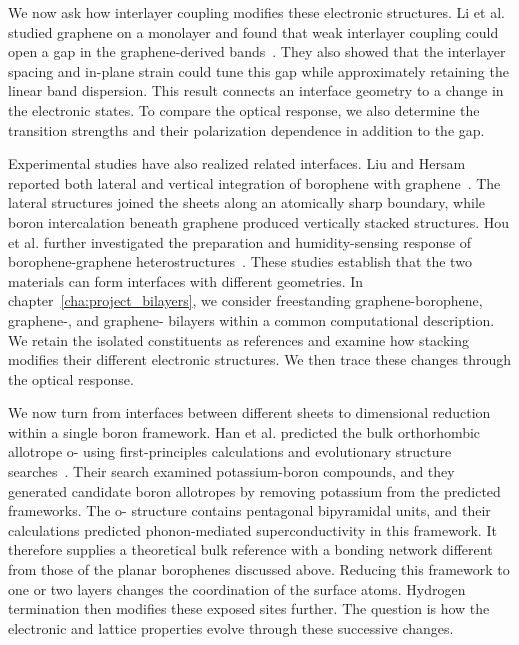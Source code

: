 We now ask how interlayer coupling modifies these electronic structures.
Li et al. studied graphene on a  monolayer and found that weak interlayer coupling could open a gap in the graphene-derived bands~\cite{li2014tunable}.
They also showed that the interlayer spacing and in-plane strain could tune this gap while approximately retaining the linear band dispersion.
This result connects an interface geometry to a change in the electronic states.
To compare the optical response, we also determine the transition strengths and their polarization dependence in addition to the gap.

Experimental studies have also realized related interfaces.
Liu and Hersam reported both lateral and vertical integration of borophene with graphene~\cite{liu2019borophene}.
The lateral structures joined the sheets along an atomically sharp boundary, while boron intercalation beneath graphene produced vertically stacked structures.
Hou et al. further investigated the preparation and humidity-sensing response of borophene-graphene heterostructures~\cite{hou2021borophene}.
These studies establish that the two materials can form interfaces with different geometries.
In chapter~\ref{cha:project_bilayers}, we consider freestanding graphene-borophene, graphene-, and graphene- bilayers within a common computational description.
We retain the isolated constituents as references and examine how stacking modifies their different electronic structures.
We then trace these changes through the optical response.

We now turn from interfaces between different sheets to dimensional reduction within a single boron framework.
Han et al. predicted the bulk orthorhombic allotrope o- using first-principles calculations and evolutionary structure searches~\cite{han2023superconducting}.
Their search examined potassium-boron compounds, and they generated candidate boron allotropes by removing potassium from the predicted frameworks.
The o- structure contains pentagonal bipyramidal units, and their calculations predicted phonon-mediated superconductivity in this framework.
It therefore supplies a theoretical bulk reference with a bonding network different from those of the planar borophenes discussed above.
Reducing this framework to one or two layers changes the coordination of the surface atoms.
Hydrogen termination then modifies these exposed sites further.
The question is how the electronic and lattice properties evolve through these successive changes.

